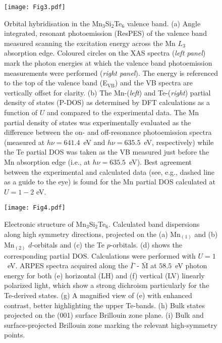 \documentclass[preprint,amsmath,amssymb,aps,nofootinbib,superscriptaddress]{revtex4-2}
\begin{document}
\begin{figure}
\texttt{[image: Fig3.pdf]}
\caption{\label{fig:fig3} Orbital hybridisation in the Mn$_{3}$Si$_{2}$Te$_{6}$ valence band. (a) Angle integrated, resonant photoemission (ResPES) of the valence band measured scanning the excitation energy across the Mn $L_3$ absorption edge. Coloured circles on the XAS spectra (\emph{left panel}) mark the photon energies at which the valence band photoemission measurements were performed (\emph{right panel}). The energy is referenced to the top of the valence band (E$_\mathrm{VB}$) and the VB spectra are vertically offset for clarity. (b) The Mn-(\emph{left}) and Te-(\emph{right}) partial density of states (P-DOS) as determined by DFT calculations as a function of $U$ and compared to the experimental data. The Mn partial density of states was experimentally evaluated as the difference between the on- and off-resonance photoemission spectra (measured at $h\nu=641.4$~eV and $h\nu=635.5$~eV, respectively) while the Te partial DOS was taken as the VB measured just before the Mn absorption edge (i.e., at $h\nu=635.5$~eV). Best agreement between the experimental and calculated data (see, e.g., dashed line as a guide to the eye) is found for the Mn partial DOS calculated at $U=1-2$ eV.}
\end{figure}

\begin{figure*}
\texttt{[image: Fig4.pdf]}
\caption{\label{fig:fig4} Electronic structure of Mn$_{3}$Si$_{2}$Te$_{6}$. Calculated band dispersions along high symmetry directions, projected on the (a) Mn$_{(1)}$ and (b) Mn$_{(2)}$ $d$-orbitals and (c) the Te $p$-orbitals. (d) shows the corresponding partial DOS. Calculations were performed with $U=1$~eV. ARPES spectra acquired along the $\bar{\Gamma}$ - $\bar{\text{M}}$ at $58.5$~eV photon energy for both (e) horizontal (LH) and (f) vertical (LV) linearly polarized light, which show a strong dichroism particularly for the Te-derived states. (g) A magnified view of (e) with enhanced contrast, better highlighting the upper Te-bands. (h) Bulk states projected on the (001) surface Brillouin zone plane. (i) Bulk and surface-projected Brillouin zone marking the relevant high-symmetry points.}
\end{figure*}
\end{document}

